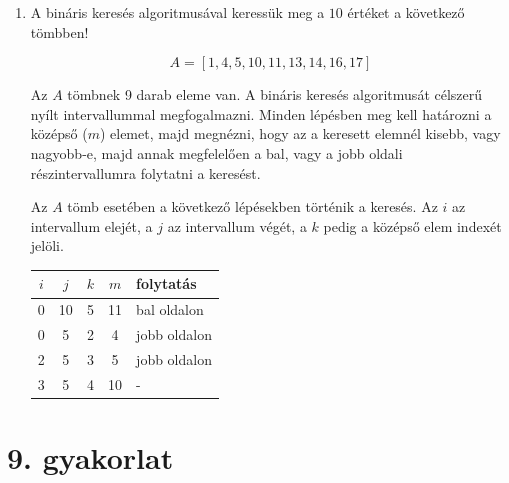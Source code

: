 \documentclass[a4paper]{article}
\newenvironment{solution}
{\color{RoyalBlue}}{\bigskip}
\begin{document}
\begin{enumerate}
\item A bináris keresés algoritmusával keressük meg a $10$ értéket a következő tömbben!

$$
A = [1, 4, 5, 10, 11, 13, 14, 16, 17]
$$

\begin{solution}

Az $A$ tömbnek 9 darab eleme van. A bináris keresés algoritmusát célszerű nyílt intervallummal megfogalmazni. Minden lépésben meg kell határozni a középső ($m$) elemet, majd megnézni, hogy az a keresett elemnél kisebb, vagy nagyobb-e, majd annak megfelelően a bal, vagy a jobb oldali részintervallumra folytatni a keresést.

Az $A$ tömb esetében a következő lépésekben történik a keresés. Az $i$ az intervallum elejét, a $j$ az intervallum végét, a $k$ pedig a középső elem indexét jelöli.

\begin{center}
\begin{tabular}{|c|c|c|c|l|}
$i$ & $j$ & $k$ & $m$ & folytatás \\
\hline
0 & 10 & 5 & 11 & bal oldalon \\
0 & 5 & 2 & 4 & jobb oldalon \\
2 & 5 & 3 & 5 & jobb oldalon \\
3 & 5 & 4 & 10 & - \\
\hline
\end{tabular}
\end{center}

\end{solution}

\end{enumerate}

\section*{9. gyakorlat}
\end{document}
